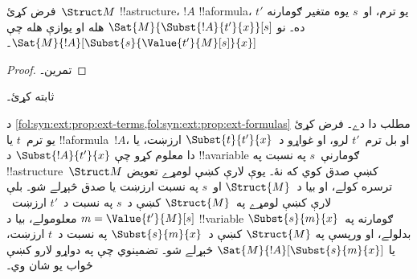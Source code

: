 \documentclass[../../../include/open-logic-section]{subfiles}
\begin{document}
\begin{prop}
فرض کړئ~$\Struct M$ !!a{structure}، $!A$ !!a{formula}، $t'$ يو ترم،
او~$s$ يوه متغير ګومارنه ده۔ نو
$\Sat{M}{\Subst{!A}{t'}{x}}[s]$ هله او يوازې هله چې
$\Sat{M}{!A}[\Subst{s}{\Value{t'}{M}[s]}{x}]$۔
\end{prop}

\begin{proof}
تمرین۔
\end{proof}

\begin{prob}
 ثابته کړئ۔
\end{prob}

\begin{explain}
  د \cref{fol:syn:ext:prop:ext-terms,fol:syn:ext:prop:ext-formulas}
  مطلب دا دے۔ فرض کړئ يو ترم~$t$ يا !!a{formula}~$!A$، او بل ترم~$t'$
  لرو، او غواړو د~$\Subst{t}{t'}{x}$ ارزښت، يا دا معلوم کړو چې
  $\Subst{!A}{t'}{x}$ د !!a{variable} ګومارنې~$s$ په نسبت په
  !!a{structure}~$\Struct M$ کښې صدق کوي که نۀ۔ يوې لارې کښې لومړے
  تعويض ترسره کولے، او بيا د~$\Struct{M}$ او~$s$ په نسبت ارزښت يا
  صدق څېړلے شو۔ بلې لارې کښې لومړے په~$\Struct{M}$ کښې د~$s$ په نسبت
  د~$t'$ ارزښت~$m = \Value{t'}{M}[s]$ معلومولے، بيا د
  !!{variable} ګومارنه په~$\Subst{s}{m}{x}$ بدلولے، او ورپسې په
  $\Struct{M}$ کښې د~$\Subst{s}{m}{x}$ په نسبت د~$t$ ارزښت، يا
  $\Sat{M}{!A}[\Subst{s}{m}{x}]$ څېړلے شو۔
  تضمينوي چې په دواړو لارو کښې ځواب يو شان وي۔
\end{explain}
\end{document}
